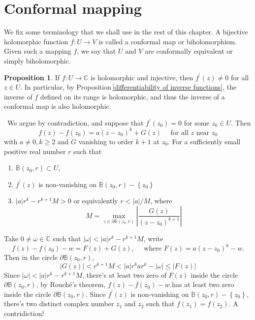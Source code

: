 \documentclass[12pt,a4paper]{book}
\newenvironment{prooff}{{\noindent\it\textcolor{cyan!40!black}{Proof}:}\,}{\par}
\newcommand{\bbrace}[1]{\left\{ #1 \right\} }
\newcommand{\bb}[1]{\mathbb{#1}}
\newcommand{\p}{^{\prime}}
\newenvironment{enu}{\begin{enumerate}[(1)]}{\end{enumerate}}
\theoremstyle{definition}
\newtheorem{prop}[defn]{Proposition}
\begin{document}
\section{Conformal mapping}
We fix some terminology that we shall use in the rest of this chapter. A bijective holomorphic function 
$f: U \rightarrow V$ is called a conformal map or biholomorphism. Given such a mapping $f$, we say that $U$ and $V$ are conformally equivalent or simply biholomorphic. 
\begin{prop}
    If $f: U \rightarrow \bb{C}$ is holomorphic and injective, 
    then $f^{\prime}(z) \neq 0$ for all $z \in U$. 
    In particular, by Proposition\,\ref{differentiability of inverse functions}, 
    the inverse of $f$ defined on its range is holomorphic, and thus the inverse of a conformal map is also holomorphic.
\end{prop}
\begin{prooff}
    We argue by contradiction, and suppose that $f^{\prime}\left(z_0\right)=0$ for some $z_0 \in U$. Then
$$
f(z)-f\left(z_0\right)=a\left(z-z_0\right)^k+G(z) \quad \text { for all } z \text { near } z_0
$$
with $a \neq 0, k \geq 2$ and $G$ vanishing to order $k+1$ at $z_0$. 
For a sufficiently small positive real number $r$ such that 
\begin{enu}
    \item $\overline{\bb{B}}(z_0,r)\subset U$, 
    \item $f\p(z)$ is non-vanishing on $\bb{B}(z_0,r)-\bbrace{z_0}$
    \item $|a|r^k -r^{k+1}M>0$ or equivalently $r< |a|/M$, where 
    \begin{equation*}
        M=\max_{z\in \partial\bb{B}(z_0,r)} \left|\frac{G(z)}{(z-z_0)^{k+1}}\right|
    \end{equation*}
\end{enu}
Take $0\neq \omega\in \bb{C}$ such that $|\omega|<|a|r^k -r^{k+1}M$, write 
$$
f(z)-f\left(z_0\right)-w=F(z)+G(z), \quad \text { where } F(z)=a\left(z-z_0\right)^k-w.
$$
Then in the circle $\partial\bb{B}(z_0,r)$, 
\begin{equation*}
    |G(z)|< r^{k+1}M < |a| r^k ar^k-|\omega| \le |F(z)|
\end{equation*}
Since $|\omega|<|a|r^k -r^{k+1}M$, there's at least two zero 
of $F(z)$ inside the circle $\partial\bb{B}(z_0,r)$, by Rouché's theorem, 
$f(z)-f\left(z_0\right)-w$ has at least two zero inside the circle $\partial\bb{B}(z_0,r)$. 
Since $f\p(z)$ is non-vanishing on $\bb{B}(z_0,r)-\bbrace{z_0}$, there's two distinct complex number $z_1$ and $z_2$ 
such that $f(z_1)=f(z_2)$. A contridiction!








\end{prooff}
\end{document}

